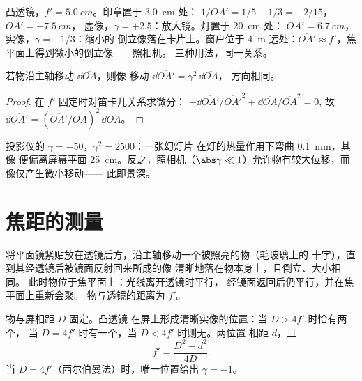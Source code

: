 \begin{example}[同一透镜的三种用法]\label{ex:b1:mirrors-thin-lenses:lensuses}
凸透镜，$f' = \qty{5.0}{cm}$。印章置于 \qty{3.0}{cm} 处：
$1/\overline{OA'} = 1/5 - 1/3 = -2/15$，$\overline{OA'} = \qty{-7.5}{cm}$，
虚像，$\gamma = +2.5$：放大镜。灯置于 \qty{20}{cm} 处：
$\overline{OA'} = \qty{6.7}{cm}$，实像，$\gamma = -1/3$：缩小的
倒立像落在卡片上。窗户位于 \qty{4}{m} 远处：$\overline{OA'}
\approx f'$，焦平面上得到微小的倒立像——照相机。
三种用法，同一关系。
\end{example}

\begin{proposition}[纵向放大率]\label{prop:b1:mirrors-thin-lenses:longitudinal}
若物沿主轴移动 $\dd\overline{OA}$，则像
移动 $\dd\overline{OA'} = \gamma^2\,\dd\overline{OA}$，
方向相同。
\end{proposition}

\begin{proof}
在 $f'$ 固定时对笛卡儿关系求微分：
$-\dd\overline{OA'}/\overline{OA'}^2 + \dd\overline{OA}/\overline{OA}^2 = 0$,
故 $\dd\overline{OA'} = (\overline{OA'}/\overline{OA})^2\,\dd\overline{OA}$。
\end{proof}

\begin{remark}[焦深]\label{rem:b1:mirrors-thin-lenses:depth}
投影仪的 $\gamma = -50$，$\gamma^2 = 2500$：一张幻灯片
在灯的热量作用下弯曲 \qty{0.1}{mm}，其像
便偏离屏幕平面 \qty{25}{cm}。反之，照相机（$\abs\gamma
\ll 1$）允许物有较大位移，而像仅产生微小移动——
此即景深。
\end{remark}

\section{焦距的测量}

\begin{method}[自准直法]\label{met:b1:mirrors-thin-lenses:autocollimation}
将平面镜紧贴放在透镜后方，沿主轴移动一个被照亮的物（毛玻璃上的
十字），直到其经透镜后被镜面反射回来所成的像
清晰地落在物本身上，且倒立、大小相同。
此时物位于焦平面上：光线离开透镜时平行，
经镜面返回后仍平行，并在焦平面上重新会聚。
物与透镜的距离为 $f'$。
\end{method}

\begin{proposition}[贝塞尔法]\label{prop:b1:mirrors-thin-lenses:bessel}
物与屏相距 $D$ 固定。凸透镜
在屏上形成清晰实像的位置：当 $D > 4f'$ 时恰有两个，
当 $D = 4f'$ 时有一个，当 $D < 4f'$ 时则无。两位置
相距 $d$，且
\[
f' = \frac{D^2 - d^2}{4D} .
\]
当 $D = 4f'$（西尔伯曼法）时，唯一位置给出 $\gamma = -1$。
\end{proposition}

